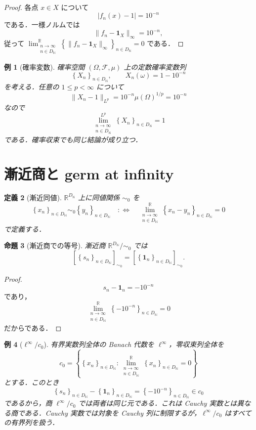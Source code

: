 \documentclass[a4paper,11pt]{ltjsarticle}
\theoremstyle{jpdef}
\newtheorem{definition}{定義}[section]
\newtheorem{example}[definition]{例}
\theoremstyle{jpthm}
\newtheorem{proposition}[definition]{命題}
\newcommand{\N}{\mathbb{N}}
\newcommand{\R}{\mathbb{R}}
\newcommand{\DN}{D_{\N}}
\newcommand{\set}[1]{\left\{#1\right\}}
\newcommand{\seq}[2]{\left\{#1\right\}_{#2}}
\begin{document}
\begin{proof}
各点 \(x\in X\) について
\[
  |f_n(x)-1|=10^{-n}
\]
である．一様ノルムでは
\[
  \|f_n-\mathbf1_X\|_\infty=10^{-n},
\]
従って \(\lim_{\substack{n\to\infty\\ n\in\DN}}^{\R}\seq{\|f_n-\mathbf1_X\|_\infty}{n\in\DN}=0\) である．
\end{proof}

\begin{example}[確率変数]
確率空間 \((\Omega,\mathcal F,\mu)\) 上の定数確率変数列
\[
  \seq{X_n}{n\in\DN},
  \qquad
  X_n(\omega)=1-10^{-n}
\]
を考える．任意の \(1\le p<\infty\) について
\[
  \|X_n-1\|_{L^p}=10^{-n}\mu(\Omega)^{1/p}=10^{-n}
\]
なので
\[
  \lim_{\substack{n\to\infty\\ n\in\DN}}^{L^p}\seq{X_n}{n\in\DN}=1
\]
である．確率収束でも同じ結論が成り立つ．
\end{example}

\section{漸近商と germ at infinity}

\begin{definition}[漸近同値]
\(\R^{\DN}\) 上に同値関係 \(\sim_0\) を
\[
  \seq{x_n}{n\in\DN}\sim_0\seq{y_n}{n\in\DN}
  \quad:\Longleftrightarrow\quad
  \lim_{\substack{n\to\infty\\ n\in\DN}}^{\R}\seq{x_n-y_n}{n\in\DN}=0
\]
で定義する．
\end{definition}

\begin{proposition}[漸近商での等号]
漸近商 \(\R^{\DN}/\sim_0\) では
\[
  [\seq{s_n}{n\in\DN}]_{\sim_0}
  =[\seq{\mathbf1_n}{n\in\DN}]_{\sim_0}.
\]
\end{proposition}

\begin{proof}
\[
  s_n-\mathbf1_n=-10^{-n}
\]
であり，
\[
  \lim_{\substack{n\to\infty\\ n\in\DN}}^{\R}\seq{-10^{-n}}{n\in\DN}=0
\]
だからである．
\end{proof}

\begin{example}[\(\ell^\infty/c_0\)]
有界実数列全体の Banach 代数を \(\ell^\infty\)，零収束列全体を
\[
  c_0=\set{\seq{x_n}{n\in\DN}:\lim_{\substack{n\to\infty\\ n\in\DN}}^{\R}\seq{x_n}{n\in\DN}=0}
\]
とする．このとき
\[
  \seq{s_n}{n\in\DN}-\seq{\mathbf1_n}{n\in\DN}=\seq{-10^{-n}}{n\in\DN}\in c_0
\]
であるから，商 \(\ell^\infty/c_0\) では両者は同じ元である．これは Cauchy 実数とは異なる商である．Cauchy 実数では対象を Cauchy 列に制限するが，\(\ell^\infty/c_0\) はすべての有界列を扱う．
\end{example}
\end{document}
